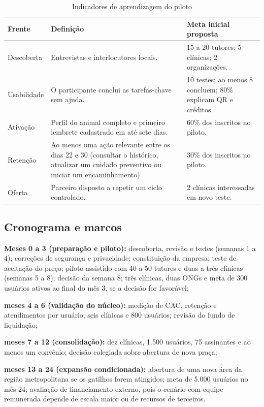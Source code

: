 \begin{table}[htb]
\centering
\caption{Indicadores de aprendizagem do piloto}
\label{tab:indicadores}
\begin{tabularx}{\textwidth}{L{2.4cm} Y L{4.2cm}}
\toprule
\textbf{Frente} & \textbf{Definição} & \textbf{Meta inicial proposta}\\
\midrule
Descoberta & Entrevistas e interlocutores locais. & 15 a 20 tutores; 5 clínicas; 2 organizações.\\
Usabilidade & O participante conclui as tarefas-chave sem ajuda. & 10 testes; ao menos 8 concluem; 80\% explicam QR e créditos.\\
Ativação & Perfil do animal completo e primeiro lembrete cadastrado em até sete dias. & 60\% dos inscritos no piloto.\\
Retenção & Ao menos uma ação relevante entre os dias 22 e 30 (consultar o histórico, atualizar um cuidado preventivo ou iniciar um encaminhamento). & 30\% dos inscritos no piloto.\\
Oferta & Parceiro disposto a repetir um ciclo controlado. & 2 clínicas interessadas em novo teste.\\
\bottomrule
\end{tabularx}
\fonteautores
\end{table}

\subsection{Cronograma e marcos}

\begin{alineas}
  \item \textbf{Meses 0 a 3 (preparação e piloto):} descoberta, revisão e testes (semanas 1 a 4); correções de segurança e privacidade; constituição da empresa; teste de aceitação do preço; piloto assistido com 40 a 50 tutores e duas a três clínicas (semanas 5 a 8); decisão da semana 8; três clínicas, duas ONGs e meta de 300 usuários ativos ao final do mês 3, se a decisão for favorável;
  \item \textbf{meses 4 a 6 (validação do núcleo):} medição de CAC, retenção e atendimentos por usuário; seis clínicas e 800 usuários; revisão do fundo de liquidação;
  \item \textbf{meses 7 a 12 (consolidação):} dez clínicas, 1.500 usuários, 75 assinantes e ao menos um convênio; decisão colegiada sobre abertura de nova praça;
  \item \textbf{meses 13 a 24 (expansão condicionada):} abertura de uma nova área da região metropolitana se os gatilhos forem atingidos; meta de 5.000 usuários no mês 24; avaliação de financiamento externo, pois o cenário com equipe remunerada depende de escala maior ou de recursos de terceiros.
\end{alineas}


